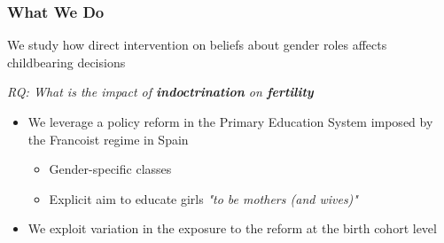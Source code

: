 \documentclass[aspectratio=169]{beamer}
\begin{document}
\begin{frame}
\frametitle{What We Do}

We study how direct intervention on  beliefs about gender roles affects childbearing decisions
\pause

\medskip
\centering
\downarrow

\begin{center}
    \textit{RQ: What is the impact of \textbf{indoctrination} on \textbf{fertility}}
\pause
\end{center}
\begin{itemize}
    
 \item We leverage a policy reform in the Primary Education System imposed by the Francoist regime in Spain
 \begin{itemize}
 \pause
\medskip
     \item Gender-specific classes
          \medskip
\pause
     \item Explicit aim to educate girls \textit{"to be mothers (and wives)"} 
 \end{itemize}
\pause
          \medskip

 \item We exploit variation in the exposure to the reform at the birth cohort level 
           \medskip
\end{itemize}
 
\end{frame}
\end{document}
